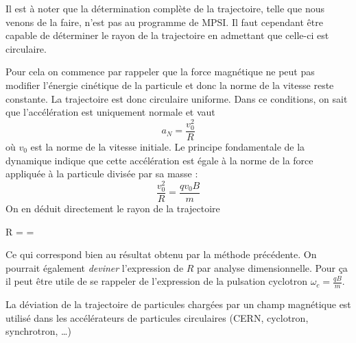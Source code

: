 \documentclass{cours}
\begin{document}
Il est à noter que la détermination complète de la trajectoire, telle que nous venons de la faire, n'est pas au programme de MPSI. Il faut cependant être capable de déterminer le rayon de la trajectoire en admettant que celle-ci est circulaire.

Pour cela on commence par rappeler que la force magnétique ne peut pas modifier l'énergie cinétique de la particule et donc la norme de la vitesse reste constante. La trajectoire est donc circulaire uniforme. Dans ce conditions, on sait que l'accélération est uniquement normale et vaut 
\begin{equation}
  a_N = \frac{v_0^2}{R} 
\end{equation}
où $v_0$ est la norme de la vitesse initiale. Le principe fondamentale de la dynamique indique que cette accélération est égale à la norme de la force appliquée à la particule divisée par sa masse :
\begin{equation}
  \frac{v_0^2}{R} = \frac{qv_0B}{m}
\end{equation}
On en déduit directement le rayon de la trajectoire

\begin{eqencadre}
  R =  = 
\end{eqencadre}
Ce qui correspond bien au résultat obtenu par la méthode précédente. On pourrait également \emph{deviner} l'expression de $R$ par analyse dimensionnelle. Pour ça il peut être utile de se rappeler de l'expression de la pulsation cyclotron $\omega_c=\frac{qB}{m}$. 

La déviation de la trajectoire de particules chargées par un champ magnétique est utilisé dans les accélérateurs de particules circulaires (CERN, cyclotron, synchrotron, \ldots)
\end{document}
